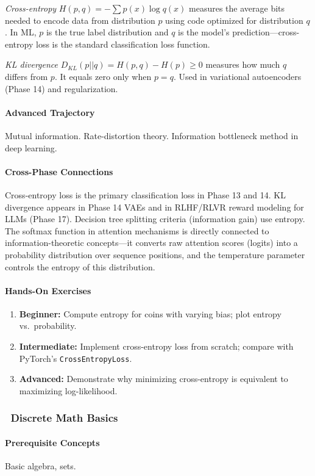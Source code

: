 \documentclass[11pt, a4paper, oneside]{report}
\newcommand{\awareness}[1]{\subsubsection{\texorpdfstring{\fcolorbox{gray!50}{gray!10}{\footnotesize\bfseries\color{gray!50!black} AWARENESS}~#1}{#1}}}
\begin{document}
\emph{Cross-entropy} $H(p,q) = -\sum p(x) \log q(x)$ measures the average bits needed to encode data from distribution $p$ using code optimized for distribution $q$. In ML, $p$ is the true label distribution and $q$ is the model's prediction---cross-entropy loss is the standard classification loss function.

\emph{KL divergence} $D_{KL}(p||q) = H(p,q) - H(p) \geq 0$ measures how much $q$ differs from $p$. It equals zero only when $p = q$. Used in variational autoencoders (Phase 14) and regularization.

\paragraph{Advanced Trajectory} Mutual information. Rate-distortion theory. Information bottleneck method in deep learning.

\paragraph{Cross-Phase Connections} Cross-entropy loss is the primary classification loss in Phase 13 and 14. KL divergence appears in Phase 14 VAEs and in RLHF/RLVR reward modeling for LLMs (Phase 17). Decision tree splitting criteria (information gain) use entropy. The softmax function in attention mechanisms is directly connected to information-theoretic concepts---it converts raw attention scores (logits) into a probability distribution over sequence positions, and the temperature parameter controls the entropy of this distribution.

\paragraph{Hands-On Exercises}
\begin{enumerate}[leftmargin=*]
\item \textbf{Beginner:} Compute entropy for coins with varying bias; plot entropy vs.\ probability.
\item \textbf{Intermediate:} Implement cross-entropy loss from scratch; compare with PyTorch's \texttt{CrossEntropyLoss}.
\item \textbf{Advanced:} Demonstrate why minimizing cross-entropy is equivalent to maximizing log-likelihood.
\end{enumerate}

\awareness{Discrete Math Basics}

\paragraph{Prerequisite Concepts} Basic algebra, sets.
\end{document}
